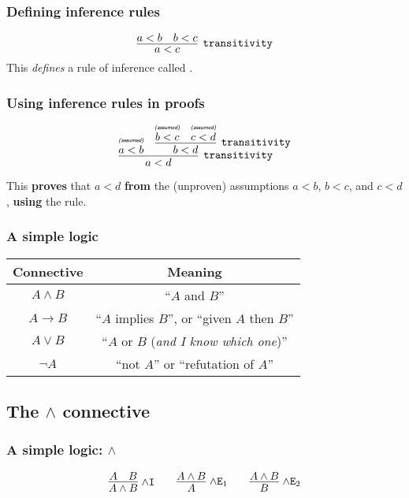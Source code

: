 \documentclass{beamer}
\newcommand{\isassumed}{\textsf{\tiny{\emph{(assumed)}}}}
\newcommand{\assumed}[1]{\deduce{#1}{\isassumed}}
\begin{document}
\begin{frame}
  \frametitle{Defining inference rules}

  \[
  \infer[\rn{transitivity}]{a < c}{a < b & b < c}
  \]
  This \emph{defines} a rule of inference called .

\end{frame}

\begin{frame}
  \frametitle{Using inference rules in proofs}


  \[
  \infer[\rn{transitivity}]{a < d}{
    \assumed{a < b} &
    \infer[\rn{transitivity}]{b < d}{
      \assumed{b < c} &
      \assumed{c < d}}}
  \]

  This \textbf{proves} that $a < d$ \textbf{from} the (unproven) assumptions $a
  < b$, $b < c$, and $c < d$, \textbf{using} the  rule.

\end{frame}

\begin{frame}
  \frametitle{A simple logic}
  \begin{center}
    \begin{tabular}{cc}
      Connective & Meaning\\
      \hline
      $A \wedge B$ & ``$A$ and $B$''\\
      $A \to B$ & ``$A$ implies $B$'', or ``given $A$ then $B$''\\
      \color{ignore} $A \vee B$
      & \color{ignore} ``$A$ or $B$ (\emph{and I know which one})''\\
      \color{ignore} $\neg A$
      & \color{ignore} ``not $A$'' or ``refutation of $A$''
    \end{tabular}
  \end{center}
\end{frame}


\subsection{The $\wedge$ connective}
\begin{frame}
  \frametitle{A simple logic: $\wedge$}

  \[
  \infer[\!\wedge\rn{I}]{A \wedge B}{A & B}
  \qquad
  \infer[\!\wedge\rn{E}_1]{A}{A \wedge B} \qquad
  \infer[\!\wedge\rn{E}_2]{B}{A \wedge B}
  \]
\end{frame}
\end{document}

